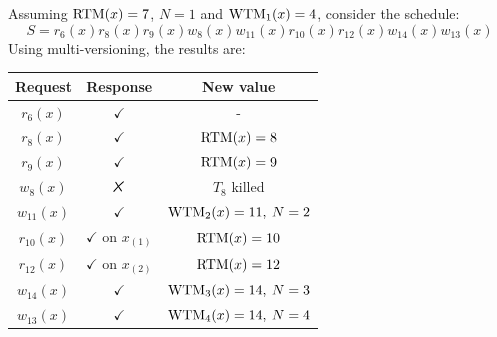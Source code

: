 \begin{example}
    Assuming  $\textnormal{RTM}(x)=7$, $N=1$ and $\textnormal{WTM}_1(x)=4$, consider the schedule:
    \[S=r_6(x) r_8(x) r_9(x) w_8(x) w_{11}(x) r_{10}(x) r_{12}(x) w_{14}(x) w_{13}(x)\]
    Using multi-versioning, the results are:
    \begin{table}[H]
        \centering
        \begin{tabular}{ccc}
        \textbf{Request} & \textbf{Response}         & \textbf{New value}  \\ \hline
        $r_6(x)$         & $\checkmark$              & -                   \\
        $r_8(x)$         & $\checkmark$              & $\textnormal{RTM}(x)=8$          \\
        $r_9(x)$         & $\checkmark$              & $\textnormal{RTM}(x)=9$          \\
        $w_8(x)$         & $\tikzxmark$              & $T_8$ killed        \\
        $w_{11}(x)$      & $\checkmark$              & $\textnormal{WTM}_2(x)=11,\:N=2$ \\
        $r_{10}(x)$      & $\checkmark$ on $x_{(1)}$ & $\textnormal{RTM}(x)=10$         \\
        $r_{12}(x)$      & $\checkmark$ on $x_{(2)}$ & $\textnormal{RTM}(x)=12$         \\
        $w_{14}(x)$      & $\checkmark$              & $\textnormal{WTM}_3(x)=14,\:N=3$ \\
        $w_{13}(x)$      & $\checkmark$              & $\textnormal{WTM}_4(x)=14,\:N=4$
        \end{tabular}
    \end{table}
\end{example}

